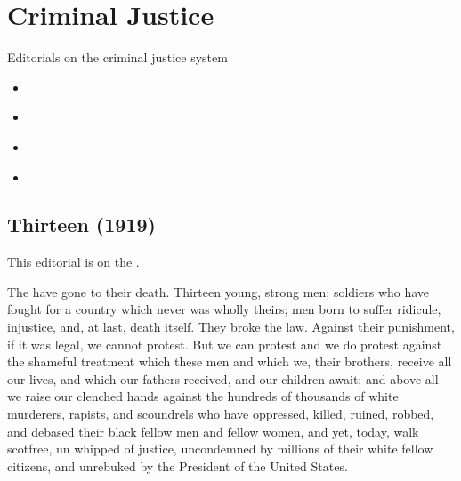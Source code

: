 \documentclass[letterpaper,10pt,english]{jupyterBook}
\begin{document}
\section{Criminal Justice}
\label{\detokenize{Sections/criminal_justice:criminal-justice}}\label{\detokenize{Sections/criminal_justice::doc}}
\sphinxAtStartPar
Editorials on  the criminal justice system
\begin{itemize}
\item {} 
\sphinxAtStartPar
{\hyperref[\detokenize{Volumes/15/03/thirteen::doc}]{}}

\item {} 
\sphinxAtStartPar
{\hyperref[\detokenize{Volumes/19/04/crime::doc}]{}}

\item {} 
\sphinxAtStartPar
{\hyperref[\detokenize{Volumes/32/01/crime::doc}]{}}

\item {} 
\sphinxAtStartPar
{\hyperref[\detokenize{Volumes/39/04/courts_and_jails::doc}]{}}

\end{itemize}


\subsection{Thirteen (1919)}
\label{\detokenize{Volumes/15/03/thirteen:thirteen-1919}}\label{\detokenize{Volumes/15/03/thirteen::doc}}
\begin{sphinxShadowBox}
\sphinxstylesidebartitle{}

\sphinxAtStartPar
This editorial is on the .
\end{sphinxShadowBox}

\sphinxAtStartPar
The have gone to their death. Thirteen young, strong men; soldiers who have fought for a country which never was wholly theirs; men born to suffer ridicule, injustice, and, at last, death itself. They broke the law. Against their punishment, if it was legal, we cannot protest. But we can protest and we do protest against the shame­ful treatment which these men and which we, their brothers, receive all our lives, and which our fathers received, and our children await; and above all we raise our clenched hands against the hundreds of thousands of white murderers, rapists, and scoundrels who have oppressed, killed, ruined, robbed, and debased their black fellow men and fellow women, and yet, today, walk scot\sphinxhyphen{}free, un\sphinxhyphen{} whipped of justice, uncondemned by millions of their white fellow citizens, and unrebuked by the President of the United States.
\end{document}

